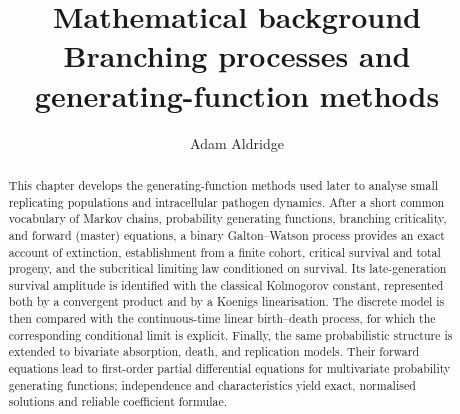 \documentclass[11pt]{article}
\title{\textbf{Mathematical background}\\[0.35em]
  \large Branching processes and generating-function methods}
\author{Adam Aldridge}
\date{}
\numberwithin{equation}{section}
\theoremstyle{plain}
\theoremstyle{definition}
\theoremstyle{remark}
\begin{document}
\maketitle
\thispagestyle{plain}
\vspace{-1.5em}

\begin{abstract}
This chapter develops the generating-function methods used later to analyse small replicating populations and intracellular pathogen dynamics.  After a short common vocabulary of Markov chains, probability generating functions, branching criticality, and forward (master) equations, a binary Galton--Watson process provides an exact account of extinction, establishment from a finite cohort, critical survival and total progeny, and the subcritical limiting law conditioned on survival.  Its late-generation survival amplitude is identified with the classical Kolmogorov constant, represented both by a convergent product and by a Koenigs linearisation.  The discrete model is then compared with the continuous-time linear birth--death process, for which the corresponding conditional limit is explicit.  Finally, the same probabilistic structure is extended to bivariate absorption, death, and replication models.  Their forward equations lead to first-order partial differential equations for multivariate probability generating functions; independence and characteristics yield exact, normalised solutions and reliable coefficient formulae.
\end{abstract}

\tableofcontents
\clearpage






\FloatBarrier
\begingroup
\small


\thispagestyle{fancy}
\endgroup
\end{document}
